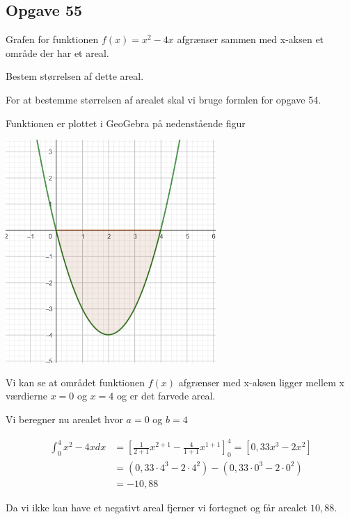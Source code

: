 \subsection{Opgave 55}

Grafen for funktionen $f(x) = x^2 - 4x$ afgrænser sammen med x-aksen et område der har et areal.

Bestem størrelsen af dette areal.

\ans

For at bestemme størrelsen af arealet skal vi bruge formlen for opgave 54.

Funktionen er plottet i GeoGebra på nedenstående figur

\includegraphics[width=8cm]{Opgave_51-56/Opgave_55/55.png}

Vi kan se at området funktionen $f(x)$ afgrænser med x-aksen ligger mellem x værdierne $x = 0$ og $x = 4$ og er det farvede areal.

Vi beregner nu arealet hvor $a = 0$ og $b = 4$

\begin{align*}
    \int_0^4 x^2 - 4x dx &= \left[\frac{1}{2 + 1}x^{2 + 1} - \frac{4}{1 + 1}x^{1+1} \right]_0^4 = \left[0,33x^3 - 2x^2\right]\\
    &= (0,33\cdot 4^3 - 2\cdot 4^2) - (0,33 \cdot 0^3 - 2 \cdot 0^2)\\
    &= -10,88
\end{align*}

Da vi ikke kan have et negativt areal fjerner vi fortegnet og får arealet $10,88$. 



